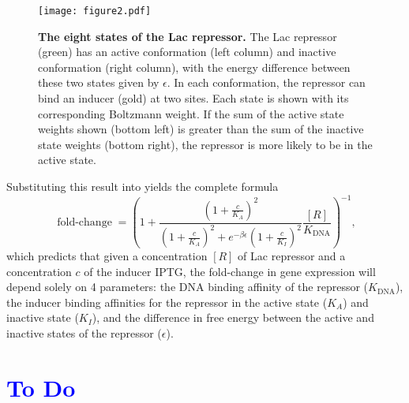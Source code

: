 \documentclass[10pt,letterpaper]{article}
\newcommand \foldchange{\operatorname{fold-change}}
\newcommand\globalScalePlots{1}
\newcommand{\K}{K_{\text{DNA}}}
\begin{document}
\begin{figure}[h]
	\centering \texttt{[image: figure2.pdf]}
	\caption{{\bf The eight states of the Lac repressor.} The Lac repressor (green)
		has an active conformation (left column) and inactive conformation (right
		column), with the energy difference between these two states given by
		$\epsilon$. In each conformation, the repressor can bind an inducer (gold) at
		two sites. Each state is shown with its corresponding Boltzmann weight. If the
		sum of the active state weights shown (bottom left) is greater than the sum of
		the inactive state weights (bottom right), the repressor is more likely to be
		in the active state.} \label{figrepressorInducerStates}
\end{figure}

Substituting this result into \eref[eq5] yields the complete formula
\begin{equation}\label{eq7}
\foldchange= \left(
1+\frac{\left(1+\frac{c}{K_A}\right)^2}{\left(1+\frac{c}{K_A}\right)^2+e^{-\beta
		\epsilon }\left(1+\frac{c}{K_I}\right)^2}\frac{[R]}{\K} \right)^{-1},
\end{equation}
which predicts that given a concentration \([R]\) of Lac repressor and a
concentration \(c\) of the inducer IPTG, the fold-change in gene expression will
depend solely on 4 parameters: the DNA binding affinity of the repressor
(\(\K\)), the inducer binding affinities for the repressor in the active state
(\(K_A\)) and inactive state (\(K_I\)), and the difference in free energy
between the active and inactive states of the repressor (\(\epsilon\)).

\section*{\textcolor{blue}{To Do}}
\end{document}

